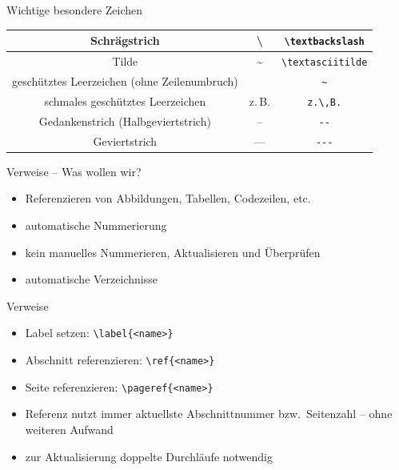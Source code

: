 \documentclass[presentation,aspectratio=169]{beamer}
\begin{document}
\begin{frame}[fragile]{Wichtige besondere Zeichen}
  \begin{tabular}{c|c|c}
    Schrägstrich                                  & \textbackslash   & \verb|\textbackslash| \\
    \hline
    Tilde                                         & \textasciitilde  & \verb|\textasciitilde| \\
    \hline
    geschütztes Leerzeichen (ohne Zeilenumbruch)  & ~                & \verb|~| \\
    \hline
    schmales geschütztes Leerzeichen              & z.\,B.           & \verb|z.\,B.| \\
    \hline
    Gedankenstrich (Halbgeviertstrich)            & --               & \verb|--| \\
    \hline
    Geviertstrich                                 & ---              & \verb|---|
  \end{tabular}
\end{frame}

\begin{frame}{Verweise -- Was wollen wir?}
  \begin{itemize}
    \item Referenzieren von Abbildungen, Tabellen, Codezeilen, etc.
    \item automatische Nummerierung
    \item kein manuelles Nummerieren, Aktualisieren und Überprüfen
    \item automatische Verzeichnisse
  \end{itemize}
\end{frame}

\begin{frame}[fragile]{Verweise}
  \begin{itemize}
    \item Label setzen: \verb|\label{<name>}|
    \item Abschnitt referenzieren: \verb|\ref{<name>}|
    \item Seite referenzieren: \verb|\pageref{<name>}|
    \item Referenz nutzt immer aktuellste Abschnittnummer bzw.~Seitenzahl -- ohne weiteren Aufwand
    \item zur Aktualisierung doppelte Durchläufe notwendig
  \end{itemize}
\end{frame}
\end{document}
